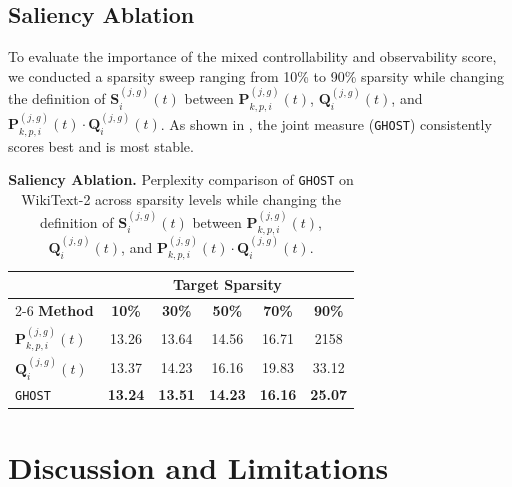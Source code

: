 \documentclass{article}
\theoremstyle{plain}
\theoremstyle{definition}
\theoremstyle{remark}
\begin{document}
\subsection{Saliency Ablation}
\label{subsec:saliency_ablation}

To evaluate the importance of the mixed controllability and observability score, we conducted a sparsity sweep ranging from 10\% to 90\% sparsity while changing the definition of $\bm{S}^{(j, g)}_i (t)$ between $\bm{P}^{(j, g)}_{k, p, i} (t)$, $\bm{Q}^{(j, g)}_{i} (t)$, and $\bm{P}^{(j, g)}_{k, p, i} (t) \cdot \bm{Q}^{(j, g)}_{i} (t)$. As shown in , the joint measure (\texttt{GHOST}) consistently scores best and is most stable.

\begin{table}[h]
\centering
\caption{\textbf{Saliency Ablation.} Perplexity comparison of \texttt{GHOST} on WikiText-2 across sparsity levels while changing the definition of $\bm{S}^{(j, g)}_i (t)$ between $\bm{P}^{(j, g)}_{k, p, i} (t)$, $\bm{Q}^{(j, g)}_{i} (t)$, and $\bm{P}^{(j, g)}_{k, p, i} (t) \cdot \bm{Q}^{(j, g)}_{i} (t)$.}
\label{tab:saliency_ablation}
\begin{tabular}{lccccc}
\toprule
& \multicolumn{5}{c}{\textbf{Target Sparsity}} \\
\cmidrule(lr){2-6}
\textbf{Method} & \textbf{10\%} & \textbf{30\%} & \textbf{50\%} & \textbf{70\%} & \textbf{90\%} \\
\midrule
$\bm{P}^{(j, g)}_{k, p, i} (t)$ & 13.26 & 13.64 & 14.56 & 16.71 & 2158 \\
$\bm{Q}^{(j, g)}_{i} (t)$ & 13.37 & 14.23 & 16.16 & 19.83 & 33.12 \\
\texttt{GHOST} & \textbf{13.24} & \textbf{13.51} & \textbf{14.23} & \textbf{16.16} & \textbf{25.07} \\
\bottomrule
\end{tabular}
\end{table}


\section{Discussion and Limitations}
\label{sec:discussion}
\end{document}
